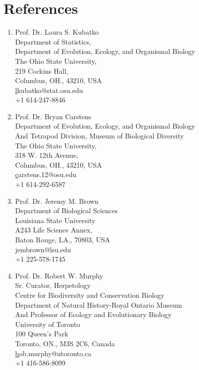 \documentclass[11pt]{article}
\begin{document}
\pagebreak
\section*{References}

\begin{enumerate}

\item Prof. Dr. Laura S. Kubatko\\Department of Statistics,\\Department of Evolution, Ecology, and Organismal Biology\\The Ohio State University,\\219 Cockins Hall,\\Columbus, OH., 43210, USA\\\href{lkubatko@stat.osu.edu}lkubatko@stat.osu.edu\\+1 614-247-8846\\

\item Prof. Dr. Bryan Carstens\\ Department of Evolution, Ecology, and Organismal Biology\\ And Tetrapod Division, Museum of Biological Diversity\\The Ohio State University,\\318 W. 12th Avenue,\\Columbus, OH., 43210, USA\\\href{carstens.12@osu.edu}carstens.12@osu.edu\\+1 614-292-6587\\

\item Prof. Dr. Jeremy M. Brown\\ Department of Biological Sciences\\Louisiana State University\\ A243 Life Science Annex,\\ Baton Rouge, LA., 70803, USA\\\href{jembrown@lsu.edu}jembrown@lsu.edu\\ +1 225-578-1745
\\

\item Prof. Dr. Robert W. Murphy\\Sr. Curator, Herpetology\\Centre for Biodiversity and Conservation Biology\\Department of Natural History-Royal Ontario Museum\\And Professor of Ecology and Evolutionary Biology\\ University of Toronto\\100 Queen’s Park\\Toronto, ON., M3S 2C6, Canada\\\href{bob.murphy@utoronto.ca}bob.murphy@utoronto.ca\\+1 416-586-8099


\end{enumerate}
\end{document}
